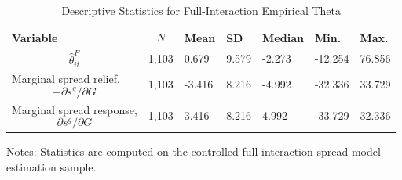 \begin{table}[H]\centering
\begin{threeparttable}
\caption{Descriptive Statistics for Full-Interaction Empirical Theta}
\label{tab:theta_descriptive_stats}
\scriptsize
\begin{tabularx}{\textwidth}{lYYYYYY}
\toprule
Variable & $$N$$ & Mean & SD & Median & Min. & Max. \\
\midrule
$$\widehat{\theta}^{F}_{it}$$ & 1,103 & 0.679 & 9.579 & -2.273 & -12.254 & 76.856 \\
Marginal spread relief, $$-\partial s^g/\partial G$$ & 1,103 & -3.416 & 8.216 & -4.992 & -32.336 & 33.729 \\
Marginal spread response, $$\partial s^g/\partial G$$ & 1,103 & 3.416 & 8.216 & 4.992 & -33.729 & 32.336 \\
\bottomrule
\end{tabularx}
\begin{tablenotes}[flushleft]\footnotesize
\item Notes: Statistics are computed on the controlled full-interaction spread-model estimation sample.
\end{tablenotes}
\end{threeparttable}
\end{table}

